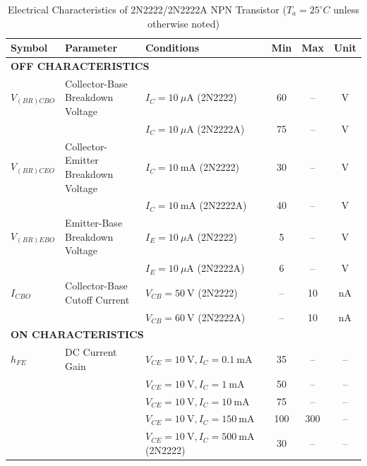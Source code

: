\documentclass[12pt, a4paper]{article}
\numberwithin{table}{section}
\numberwithin{figure}{section}
\begin{document}
\begin{table}[h!]
    \caption{Electrical Characteristics of 2N2222/2N2222A NPN Transistor ($T_a = 25^\circ C$ unless otherwise noted)}
    \label{tab:2N2222}
    \small
    {\centering
    \begin{tabularx}{\textwidth}{l X l c c c}
        \toprule
        \textbf{Symbol} & \textbf{Parameter} & \textbf{Conditions} & \textbf{Min} & \textbf{Max} & \textbf{Unit} \\ 
        \midrule
        \multicolumn{6}{l}{\textbf{OFF CHARACTERISTICS}} \\
        $V_{(BR)CBO}$ & Collector-Base Breakdown Voltage & $I_C = 10~\mu\text{A}$ (2N2222) & 60 & -- & V \\
                      &                                 & $I_C = 10~\mu\text{A}$ (2N2222A) & 75 & -- & V \\
        $V_{(BR)CEO}$ & Collector-Emitter Breakdown Voltage & $I_C = 10~\text{mA}$ (2N2222) & 30 & -- & V \\
                      &                                     & $I_C = 10~\text{mA}$ (2N2222A) & 40 & -- & V \\
        $V_{(BR)EBO}$ & Emitter-Base Breakdown Voltage & $I_E = 10~\mu\text{A}$ (2N2222) & 5 & -- & V \\
                      &                               & $I_E = 10~\mu\text{A}$ (2N2222A) & 6 & -- & V \\
        $I_{CBO}$     & Collector-Base Cutoff Current & $V_{CB} = 50~\text{V}$ (2N2222) & -- & 10 & nA \\
                      &                               & $V_{CB} = 60~\text{V}$ (2N2222A) & -- & 10 & nA \\
        \midrule
        \multicolumn{6}{l}{\textbf{ON CHARACTERISTICS}} \\
        $h_{FE}$      & DC Current Gain & $V_{CE} = 10~\text{V}, I_C = 0.1~\text{mA}$ & 35 & -- & -- \\
                      &                 & $V_{CE} = 10~\text{V}, I_C = 1~\text{mA}$ & 50 & -- & -- \\
                      &                 & $V_{CE} = 10~\text{V}, I_C = 10~\text{mA}$ & 75 & -- & -- \\
                      &                 & $V_{CE} = 10~\text{V}, I_C = 150~\text{mA}$ & 100 & 300 & -- \\
                      &                 & $V_{CE} = 10~\text{V}, I_C = 500~\text{mA}$ (2N2222) & 30 & -- & -- \\

\end{tabularx}}
\end{table}
\end{document}
